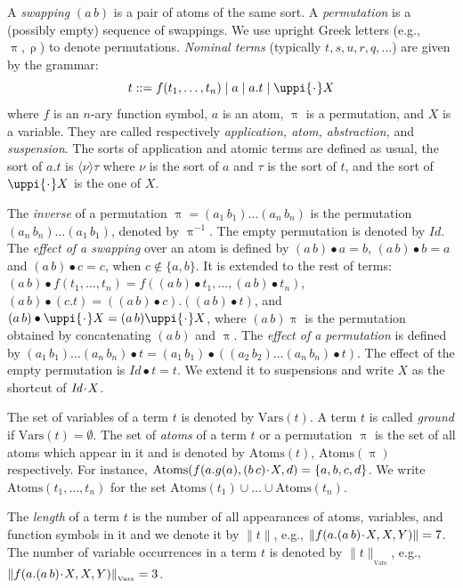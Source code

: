 \documentclass{llncs}
\newcommand{\vars}{\mathrm{Vars}}
\newcommand{\id}{\mathit{Id}}
\newcommand{\swap}[2]{\ensuremath{(#1\, #2)}}
\newcommand{\idp}{\mathit{Id}}
\newcommand{\permap}{{\mkern 1mu\cdot \mkern 1mu}}
\newcommand{\permef}{\bullet}
\newcommand\ppi{\uppi}
\newcommand\prho{\uprho}
\newcommand{\len}[1]{{\|#1\|}}
\newcommand{\vcard}[1]{\|#1\|_{_{\vars}}}
\newcommand{\atoms}{\mathrm{Atoms}}
\begin{document}
A \emph{swapping} $\swap{a}{b}$ is a pair of atoms of the same
sort. A \emph{permutation} is a (possibly empty) sequence of swappings. We use upright Greek letters (e.g., $\ppi, \prho$) to denote permutations.
\emph{Nominal terms} (typically $ t, s, u, r, q, \ldots$) are given by the
grammar:
\[ t ::=  f(t_1 , \ldots , t_n ) \mid a \mid a.t \mid \ppi \permap  X\]
where $ f$ is an $n$-ary function symbol, $a$ is an atom, $\ppi$ is a
permutation, and $ X$ is a variable. They are called respectively
\emph{application, atom, abstraction,} and \emph{suspension}. The
sorts of application and atomic terms are defined as usual, the sort
of $a.t$ is $\langle \nu\rangle \tau$ where $\nu$ is the sort of $a$
and $\tau$ is the sort of $t$, and the sort of $\ppi \permap X$ is the
one of $X$.


The \emph{inverse} of a permutation $\ppi=\swap{a_1}{b_1} \ldots \swap{a_n}{b_n}$ is the permutation $\swap{a_n}{b_n} \ldots \swap{a_1}{b_1}$, denoted by $\ppi^{-1}$. The empty permutation is denoted by $\idp$. 
The \emph{effect of a swapping} over an atom is defined by
$\swap{a}{b} \permef a = b$, $\swap{a}{b}\permef b = a$ and
$\swap{a}{b}\permef c = c$, when $c \notin \{a, b\}$. It is extended
to the rest of terms: $\swap{a}{b}\permef f(t_1,\ldots,t_n) =
f(\swap{a}{b}\permef t_1,\ldots,\swap{a}{b}\permef t_n)$,
$\swap{a}{b}\permef (c.t) = \left ( \swap{a}{b}\permef c \right
).\left (\swap{a}{b} \permef t \right ) $, and $\swap{a}{b}\permef
\ppi \permap X = \swap{a}{b}\ppi \permap X$, where $\swap{a}{b}\ppi$
is the permutation obtained by concatenating $\swap{a}{b}$ and
$\ppi$. The \emph{effect of a permutation} is defined by
$\swap{a_1}{b_1} \ldots \swap{a_n}{b_n}\permef t =
\swap{a_1}{b_1}\permef \left (\swap{a_2}{b_2} \ldots
\swap{a_n}{b_n}\permef t\right )$. The effect of the empty permutation
is $\idp\permef t = t$. We extend it to suspensions and write $X$ as
the shortcut of $\id\permap X$.


The set of variables of a term $t$ is denoted by $\vars(t)$. A term
$t$ is called \emph{ground} if $\vars(t)=\emptyset$. The set of
\emph{atoms} of a term $t$ or a permutation $\ppi$ is the set of all
atoms which appear in it and is denoted by $\atoms(t)$, $\atoms(\ppi)$
respectively. For instance, $\atoms(f(a.g(a), \swap{b}{c}\permap X,
d)=\{a,b,c,d\}$. We write $\atoms(t_1,\dots,t_n)$ for the set
$\atoms(t_1)\cup\dots\cup\atoms(t_n)$.

The \emph{length} of a term $t$ is the number of all appearances of
atoms, variables, and function symbols in it and we denote it by
$\len{t}$, e.g., $\len{f(a.\swap{a}{b} \permap X,X,Y)}=7$. The number
of variable occurrences in a term $t$ is denoted by $\vcard{t}$, e.g.,
$\vcard{f(a. \swap{a}{b} \permap X,X,Y)}=3$.
\end{document}

